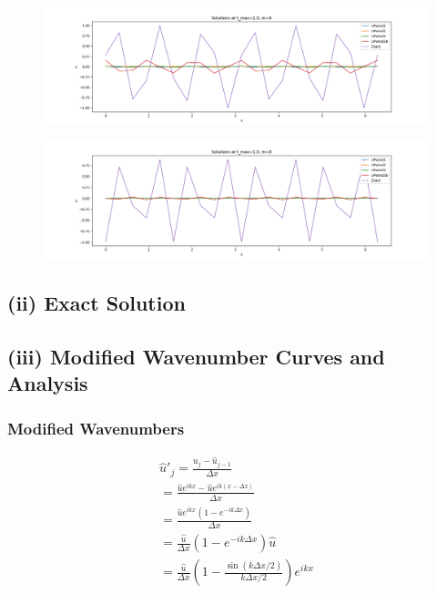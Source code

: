 \documentclass[12pt]{article}
\begin{document}
\begin{figure}[H]
    \centering
    \includegraphics[width=1\textwidth]{figures/t1m6.png}
    \label{IGs.jpg}
\end{figure}

\begin{figure}[H]
    \centering
    \includegraphics[width=1\textwidth]{figures/t1m8.png}
    \label{IGs.jpg}
\end{figure}



\subsection{(ii) Exact Solution}

\subsection{(iii) Modified Wavenumber Curves and Analysis}
\subsubsection{Modified Wavenumbers}




\begin{equation}
    \begin{aligned}
    \hat{u}'_j = \frac{{u}_j - \hat{u}_{j-1}}{\Delta x} \\
    = \frac{\hat{u} e^{ikx} - \hat{u} e^{ik(x-\Delta x)}}{\Delta x} \\
    = \frac{\hat{u} e^{ikx} (1 - e^{-ik\Delta x})}{\Delta x} \\
    = \frac{\hat{u}}{\Delta x} (1 - e^{-ik\Delta x}) \hat{u} \\
    = \frac{\hat{u}}{\Delta x} \left(1 - \frac{\sin(k\Delta x/2)}{k\Delta x/2}\right) e^{ikx}
    \end{aligned}
\end{equation}
    
\end{document}
